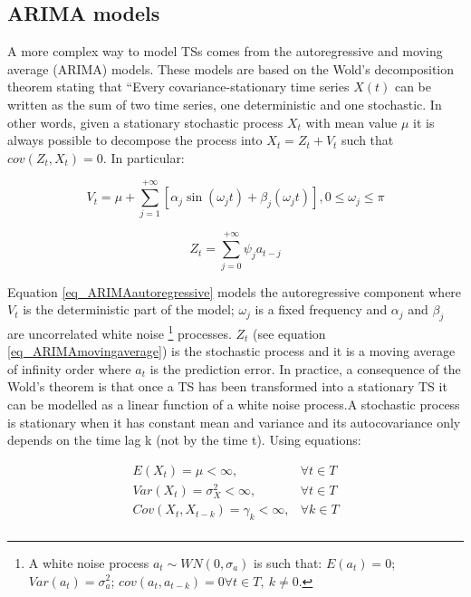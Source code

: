 \subsection{ARIMA models} \label{secARIMA}

A more complex way to model TSs comes from the autoregressive and moving average (ARIMA) models. These models are based on the Wold’s decomposition theorem stating that “Every covariance-stationary time series $X(t)$ can be written as the sum of two time series, one deterministic and one stochastic. In other words, given a stationary stochastic process $X_t$ with mean value $\mu$ it is always possible to decompose the process into $X_t=Z_t+V_t$ such that $cov\left(Z_t,X_t\right)=0$. In particular:

\begin{equation}
V_t=\mu+\sum_{j=1}^{+\infty}\left[\alpha_j\sin{\left(\omega_jt\right)}+\beta_j\left(\omega_jt\right)\right],0\le\omega_j\le\pi
\label{eq_ARIMAautoregressive}
\end{equation}

\begin{equation}
Z_t=\sum_{j=0}^{+\infty}{\psi_ja_{t-j}}
\label{eq_ARIMAmovingaverage}
\end{equation}

Equation \ref{eq_ARIMAautoregressive} models the autoregressive component where $V_t$ is the deterministic part of the model; $\omega_j$ is a fixed frequency and $\alpha_j$ and $\beta_j$ are uncorrelated white noise \footnote{A white noise process $a_t \sim WN\left(0,\sigma_a\right)$ is such that: $E\left(a_t\right)=0$; $Var\left(a_t\right)=\sigma_a^2$; $cov\left(a_t,a_{t-k}\right)=0 \forall t\in T,\ k\neq0$.} processes. $Z_t$ (see equation \ref{eq_ARIMAmovingaverage}) is the stochastic process and it is a moving average of infinity order where $a_t$ is the prediction error. In practice, a consequence of the Wold’s theorem is that once a TS has been transformed into a stationary TS it can be modelled as a linear function of a white noise process.A stochastic process is stationary when it has constant mean and variance and its autocovariance only depends on the time lag k (not by the time t). Using equations:

\begin{equation}
\begin{split}
    E\left(X_t\right)=\mu<\infty,\ & \forall t\in T\\
    Var\left(X_t\right)=\sigma_X^2<\infty,\ & \forall t\in T\\
    Cov\left(X_t,X_{t-k}\right)=\gamma_k<\infty,& \forall k\in T\\
\end{split}
\label{eq_stationarity}
\end{equation}

